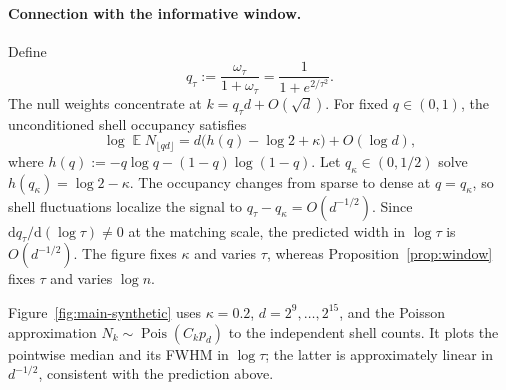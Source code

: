 \documentclass[11pt,letterpaper]{article}
\DeclareMathOperator*{\E}{\mathbb{E}}
\newcommand{\1}{\mathbbm{1}}
\begin{document}
\paragraph{Connection with the informative window.}
Define
\[
   q_\tau:=\frac{\omega_\tau}{1+\omega_\tau}
      =\frac1{1+e^{2/\tau^2}}.
\]
The null weights concentrate at \(k=q_\tau d+O(\sqrt d)\).
For fixed \(q\in(0,1)\), the unconditioned shell occupancy satisfies
\[
   \log \E N_{\lfloor qd\rfloor}
      =d\bigl(h(q)-\log2+\kappa\bigr)+O(\log d),
\]
where \(h(q):=-q\log q-(1-q)\log(1-q)\).  Let
\(q_\kappa\in(0,1/2)\) solve \(h(q_\kappa)=\log2-\kappa\).
The occupancy changes from sparse to dense at \(q=q_\kappa\), so shell
fluctuations localize the signal to
\(q_\tau-q_\kappa=O(d^{-1/2})\).  Since
\(\mathrm d q_\tau/\mathrm d(\log\tau)\ne0\) at the matching scale,
the predicted width in \(\log\tau\) is \(O(d^{-1/2})\).
The figure fixes \(\kappa\) and varies \(\tau\), whereas
Proposition~\ref{prop:window} fixes \(\tau\) and varies \(\log n\).

Figure~\ref{fig:main-synthetic} uses \(\kappa=0.2\),
\(d=2^9,\ldots,2^{15}\), and the Poisson approximation
\(N_k\sim\operatorname{Pois}(C_kp_d)\) to the independent shell counts.
It plots the
pointwise median and its FWHM in \(\log\tau\); the latter is approximately
linear in \(d^{-1/2}\), consistent with the prediction above.
\end{document}
